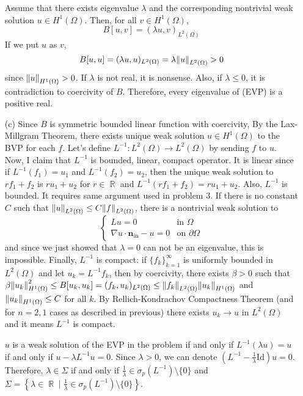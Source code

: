 \documentclass{article}
\DeclareMathOperator{\rr}{\mathbb{R}}
\begin{document}
\begin{enumerate}
Assume that there exists eigenvalue $\lambda$ and the corresponding nontrivial weak solution $u\in H^1(\Omega)$. Then, for all $v\in H^1(\Omega)$,
\begin{equation*}
B[u,v]=(\lambda u, v)_{L^2(\Omega)}
\end{equation*}
If we put $u$ as $v$,
\begin{equation*}
B[u,u]=(\lambda u, u)_{L^2(\Omega)}=\lambda\norm{u}_{L^2(\Omega)}>0
\end{equation*}
since $\norm{u}_{H^1(\Omega)}>0$. If $\lambda$ is not real, it is nonsense. Also, if $\lambda\leq 0$, it is contradiction to coercivity of $B$. Therefore, every eigenvalue of (EVP) is a positive real.
\item[(c)] Since $B$ is symmetric bounded linear function with coercivity, By the Lax-Millgram Theorem, there exists unique weak solution $u\in H^1(\Omega)$ to the BVP for each $f$. Let's define $L^{-1}:L^2(\Omega)\rightarrow L^2(\Omega)$ by sending $f$ to $u$. Now, I claim that $L^{-1}$ is bounded, linear, compact operator. It is linear since if $L^{-1}(f_1)=u_1$ and $L^{-1}(f_2)=u_2$, then the unique weak solution to $rf_1+f_2$ is $ru_1+u_2$ for $r\in \rr$ and $L^{-1}(rf_1+f_2)=ru_1+u_2$. Also, $L^{-1}$ is bounded. It requires same argument used in problem 3. If there is no constant $C$ such that $\norm{u}_{L^2(\Omega)}\leq C\norm{f}_{L^2(\Omega)}$, there is a nontrivial weak solution to
\begin{equation*}
\begin{cases}
Lu=0 & \text{in }\Omega\\
\nabla u\cdot \bm{n}_{\text{in}}-u=0 & \text{on }\partial \Omega
\end{cases}
\end{equation*}
and since we just showed that $\lambda=0$ can not be an eigenvalue, this is impossible. Finally, $L^{-1}$ is compact: if $\{f_k\}_{k=1}^\infty$ is uniformly bounded in $L^2(\Omega)$ and let $u_k=L^{-1}f_k$, then by coercivity, there exists $\beta>0$ such that $\beta\norm{u_k}^2_{H^1(\Omega)} \leq B[u_k,u_k]=(f_k,u_k)_{L^2(\Omega)}\leq \norm{f_k}_{L^2(\Omega)}\norm{u_k}_{H^1(\Omega)}$ and $\norm{u_k}_{H^1(\Omega)}\leq C$ for all $k$. By Rellich-Kondrachov Compactness Theorem (and for $n=2,1$ cases as described in previous) there exists $u_k\rightarrow u $ in $L^2(\Omega)$ and it means $L^{-1}$ is compact.


$u$ is a weak solution of the EVP in the problem if and only if $L^{-1}(\lambda u)=u$ if and only if $u-\lambda L^{-1}u=0$. Since $\lambda>0$, we can denote $\left(L^{-1}-\frac{1}{\lambda}\text{Id}\right)u=0$. Therefore, $\lambda\in \Sigma$ if and only if $\frac{1}{\lambda}\in \sigma_p(L^{-1})\setminus\{0\}$ and $\Sigma=\left\{\lambda\in \rr\mid \frac{1}{\lambda}\in \sigma_p\left(L^{-1}\right)\setminus\{0\}\right\}$.


\end{enumerate}
\end{document}
